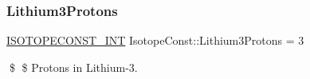 \subsubsection{\texorpdfstring{Lithium3\+Protons}{Lithium3Protons}}
{\footnotesize\ttfamily \mbox{\hyperlink{group___isotope_const-_macros_ga5f18360b3e99483a35c32d789e62621c}{I\+S\+O\+T\+O\+P\+E\+C\+O\+N\+S\+T\+\_\+\+I\+NT}} Isotope\+Const\+::\+Lithium3\+Protons = 3}

\$ \$ Protons in Lithium-\/3. 